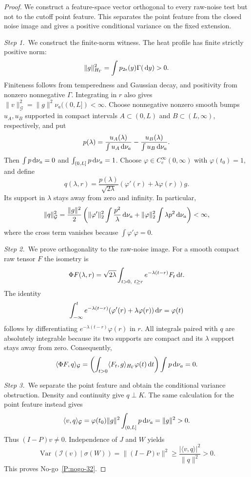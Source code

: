 \begin{proof}
  We construct a feature-space vector orthogonal to every raw-noise test but
  not to the cutoff point feature. This separates the point feature from the
  closed noise image and gives a positive conditional variance on the fixed
  extension.


  \medskip
  \noindent\textit{Step 1.~}We construct the finite-norm witness.
  The heat profile has finite strictly positive norm:
  \[
    \|g\|_{H_\Gamma}^2=\int p_{2\epsilon}(y)\Gamma(\,\mathrm{d} y)>0.
  \]
  Finiteness follows from temperedness and Gaussian decay, and positivity from
  nonzero nonnegative $\Gamma$. Integrating in $r$ also gives
  $\|v\|_{\mathcal G}^2=\|g\|^2\nu_a((0,L])<\infty$.
  Choose nonnegative nonzero smooth bumps $u_A,u_B$ supported in compact
  intervals $A\subset(0,L)$ and $B\subset(L,\infty)$, respectively, and put
  \[
    p(\lambda)=\frac{u_A(\lambda)}{\int u_A\,\mathrm{d}\nu_a}
    -\frac{u_B(\lambda)}{\int u_B\,\mathrm{d}\nu_a}.
  \]
  Then $\int p\,\mathrm{d}\nu_a=0$ and $\int_{(0,L]}p\,\mathrm{d}\nu_a=1$.
  Choose $\varphi\in C_c^\infty(0,\infty)$ with $\varphi(t_0)=1$, and define
  \[
    q(\lambda,r)=\frac{p(\lambda)}{\sqrt{2\lambda}}
    (\varphi'(r)+\lambda\varphi(r))g.
  \]
  Its support in $\lambda$ stays away from zero and infinity. In particular,
  \[
    \|q\|_{\mathcal G}^2=\frac{\|g\|^2}{2}
    \left(\|\varphi'\|_2^2\int\frac{p^2}{\lambda}\,\mathrm{d}\nu_a
    +\|\varphi\|_2^2\int\lambda p^2\,\mathrm{d}\nu_a\right)<\infty,
  \]
  where the cross term vanishes because $\int\varphi'\varphi=0$.

  \medskip
  \noindent\textit{Step 2.~}We prove orthogonality to the raw-noise image.
  For a smooth compact raw tensor $F$ the isometry is
  \[
    \Phi F(\lambda,r)=\sqrt{2\lambda}
    \int_{t>0,\ t\ge r}e^{-\lambda(t-r)}F_t\,\mathrm{d} t.
  \]
  The identity
  \[
    \int_{-\infty}^t e^{-\lambda(t-r)}
    (\varphi'(r)+\lambda\varphi(r))\,\mathrm{d} r=\varphi(t)
  \]
  follows by differentiating $e^{-\lambda(t-r)}\varphi(r)$ in $r$.
  All integrals paired with $q$ are absolutely integrable because its two
  supports are compact and its $\lambda$ support stays away from zero.
  Consequently,
  \[
    \langle\Phi F,q\rangle_{\mathcal G}
    =\left(\int_{t>0}\langle F_t,g\rangle_{H_\Gamma}
    \varphi(t)\,\mathrm{d} t\right)\int p\,\mathrm{d}\nu_a=0.
  \]

  \medskip
  \noindent\textit{Step 3.~}We separate the point feature and obtain the
  conditional variance obstruction.
  Density and continuity give $q\perp K$. The same calculation for the point
  feature instead gives
  \[
    \langle v,q\rangle_{\mathcal G}
    =\varphi(t_0)\|g\|^2\int_{(0,L]}p\,\mathrm{d}\nu_a=\|g\|^2>0.
  \]
  Thus $(I-P)v\ne0$. Independence of $J$ and $W$ yields
  \[
    \operatorname{Var}(\mathcal I(v)\mid\sigma(W))
    =\|(I-P)v\|^2\ge\frac{|\langle v,q\rangle|^2}{\|q\|^2}>0.
  \]
  This proves No-go~\ref{P:nogo-32}.
\end{proof}

